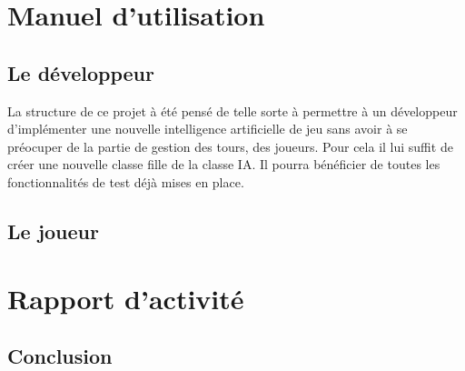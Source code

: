 \documentclass{report}
\begin{document}
\part{Manuel d'utilisation}
	\chapter{Le développeur}
	La structure de ce projet à été pensé de telle sorte à permettre à un développeur d'implémenter une nouvelle intelligence artificielle de jeu sans avoir à se préocuper de la partie de gestion des tours, des joueurs. Pour cela il lui suffit de créer une nouvelle classe fille de la classe IA. Il pourra bénéficier de toutes les fonctionnalités de test déjà mises en place.
	
	

	\chapter{Le joueur}

\part{Rapport d'activité}


\chapter*{Conclusion}
\end{document}
